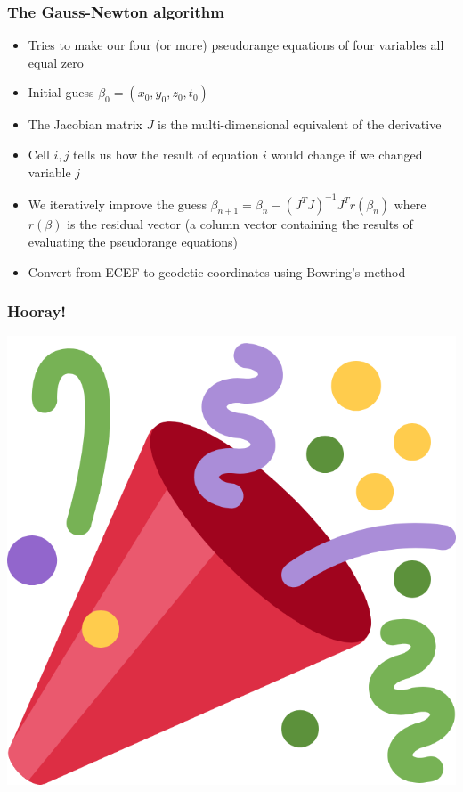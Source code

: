 \documentclass[aspectratio=169, xcolor=table]{beamer}
\begin{document}
\begin{frame}
  \frametitle{The Gauss-Newton algorithm}

  \begin{itemize}
    \item<2-> Tries to make our four (or more) pseudorange equations of four variables all equal zero
    
    \item<3-> Initial guess $\beta_0 = (x_0, y_0, z_0, t_0)$

    \item<4-> The Jacobian matrix $J$ is the multi-dimensional equivalent of the derivative
    
    \item<5-> Cell $i, j$ tells us how the result of equation $i$ would change if we changed variable $j$
    
    \item<6-> We iteratively improve the guess $\beta_{n + 1} = \beta_n - (J^T J)^{-1} J^T r(\beta_n)$ where $r(\beta)$ is the residual vector (a column vector containing the results of evaluating the pseudorange equations)
    
    \item<7-> Convert from ECEF to geodetic coordinates using Bowring's method
  \end{itemize}
\end{frame}

\begin{frame}
  \frametitle{Hooray!}

  \centering
  \includegraphics[width=\textwidth * 2 / 5]{19 party.png}
\end{frame}
\end{document}
